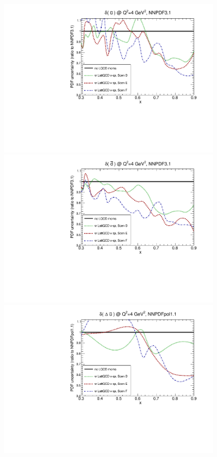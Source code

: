 \begin{figure}[!t]
\centering
\includegraphics[scale=0.45]{plots/xubar-unpol-lattice-relerr-xdata-xspace.pdf}
\includegraphics[scale=0.45]{plots/xdbar-unpol-lattice-relerr-xdata-xspace.pdf}
\includegraphics[scale=0.45]{plots/xubar-pol-lattice-relerr-xdata-xspace.pdf}

\end{figure}
